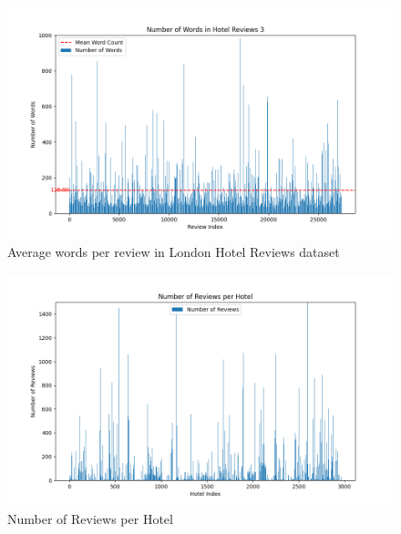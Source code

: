 \documentclass[sigconf]{acmart}
\begin{document}
\begin{figure}[H]
  \centering
  \includegraphics[width=\linewidth]{imgs/word_count_3.png}
  \caption{Average words per review in London Hotel Reviews dataset}
  \label{fig:reviewWords3}
\end{figure}

\begin{figure}[H]
  \centering
  \includegraphics[width=\linewidth]{imgs/hotel_reviews_number.png}
  \caption{Number of Reviews per Hotel}
  \label{fig:reviewsHotel}
\end{figure}

\nocite{*}
\def\BibTex{BibTeX}


\end{document}
